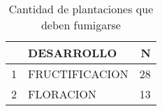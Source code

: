 \begin{table}[ht]
\centering
\begin{tabular}{rlr}
  \hline
 & DESARROLLO & N \\ 
  \hline
1 & FRUCTIFICACION &  28 \\ 
  2 & FLORACION &  13 \\ 
   \hline
\end{tabular}
\caption{Cantidad de plantaciones que deben fumigarse} 
\label{table:plantacionesAfumigar}
\end{table}
